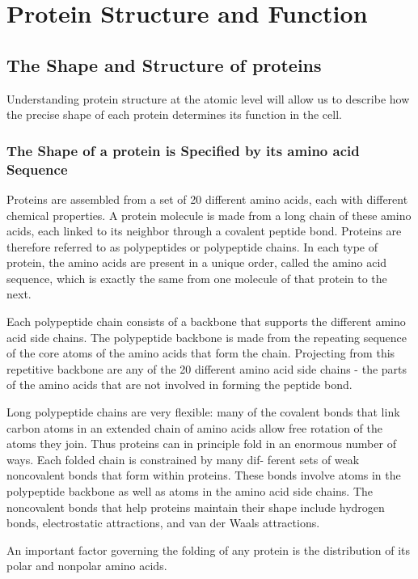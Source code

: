 \chapter{Protein Structure and Function}

\section{The Shape and Structure of proteins}

Understanding protein
structure at the atomic level will allow us to describe how the precise
shape of each protein determines its function in the cell.

\subsection{The Shape of a protein is Specified by its amino acid Sequence}

Proteins are assembled from a set of 20 different amino acids, each with different chemical properties. A protein
molecule is made from a long chain of these amino acids, each linked
to its neighbor through a covalent peptide bond. Proteins
are therefore referred to as polypeptides or polypeptide chains. In each
type of protein, the amino acids are present in a unique order, called the
amino acid sequence, which is exactly the same from one molecule
of that protein to the next.

Each polypeptide chain consists of a backbone that supports the different 
amino acid side chains. The polypeptide backbone is made from
the repeating sequence of the core atoms of the amino acids that form
the chain. Projecting from this repetitive backbone are any of the 20 different 
amino acid side chains - the parts of the amino acids that are not
involved in forming the peptide bond.

Long polypeptide chains are very flexible: many of the covalent bonds
that link carbon atoms in an extended chain of amino acids allow free
rotation of the atoms they join. Thus proteins can in principle fold in an
enormous number of ways. Each folded chain is constrained by many dif-
ferent sets of weak noncovalent bonds that form within proteins. These
bonds involve atoms in the polypeptide backbone as well as atoms in
the amino acid side chains. The noncovalent bonds that help proteins
maintain their shape include hydrogen bonds, electrostatic attractions,
and van der Waals attractions.

An important factor governing the folding of any protein is the distribution 
of its polar and nonpolar amino acids.

